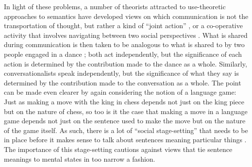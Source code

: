In light of these problems, a number of theorists attracted to use-theoretic approaches to semantics have developed views on which communication is not the transportation of thought, but rather a kind of ``joint action'' \citep{Clark:1996}, or a co-operative activity that involves navigating between two social perspectives \citep{Brandom:1994}. What is shared during communication is then taken to be analogous to what is shared to by two people engaged in a dance \citep{Clark:1996,Brandom:2010}; both act independently, but the significance of each action is determined by the contribution made to the dance as a whole. Similarly, conversationalists speak independently, but the significance of what they say is determined by the contribution made to the conversation as a whole. The point can be made even clearer by again considering the notion of a language game: Just as making a move with the king in chess depends not just on the king piece but on the nature of chess, so too is it the case that making a move in a language game depends not just on the sentence used to make the move but on the nature of the game itself. As such, there is a lot of ``social stage-setting'' that needs to be in place before it makes sense to talk about sentences meaning particular things \citep[][p. 461]{Brandom:1994}. The importance of this stage-setting cautions against views that tie sentence meanings to mental states in too narrow a fashion. 


